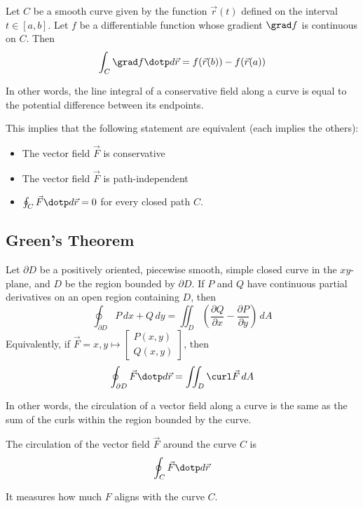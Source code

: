 \begin{namedtheorem}
  Let $C$ be a smooth curve given by the function $\vec{r}(t)$ defined on the interval $t \in [a, b]$. Let $f$ be a differentiable function whose gradient $\grad f$ is continuous on $C$. Then
  \[
    \int_C \grad f \dotp d\vec{r} = f(\vec{r}(b)) - f(\vec{r}(a))
  \]

  In other words, the line integral of a conservative field along a curve is equal to the potential difference between its endpoints.

  This implies that the following statement are equivalent (each implies the others):
  \begin{itemize}
    \item The vector field $\vec{F}$ is conservative
    \item The vector field $\vec{F}$ is path-independent
    \item $\oint_C \vec{F} \dotp d\vec{r} = 0$ for every closed path $C$.
  \end{itemize}
\end{namedtheorem}

\subsection{Green's Theorem}

\begin{namedtheorem}
  Let $\partial D$ be a positively oriented, piecewise smooth, simple closed curve in the $xy$-plane, and $D$ be the region bounded by $\partial D$. If $P$ and $Q$ have continuous partial derivatives on an open region containing $D$, then
  \[
    \oint_{\partial D} P \,dx + Q \,dy = \iint_D \left(\frac{\partial Q}{\partial x} - \frac{\partial P}{\partial y}\right) \,dA
  \]
  Equivalently, if $\vec{F} = x, y \mapsto \begin{bmatrix}
    P(x, y) \\
    Q(x, y)
  \end{bmatrix}$, then
  \[
    \oint_{\partial D} \vec{F} \dotp d\vec{r} = \iint_D \curl \vec{F} \,dA
  \]

  In other words, the circulation of a vector field along a curve is the same as the sum of the curls within the region bounded by the curve.
\end{namedtheorem}

\begin{definition}[Circulation]
  The circulation of the vector field $\vec{F}$ around the curve $C$ is 
  \[
    \oint_{C} \vec{F} \dotp d\vec{r}
  \]

  It measures how much $F$ aligns with the curve $C$.
\end{definition}


